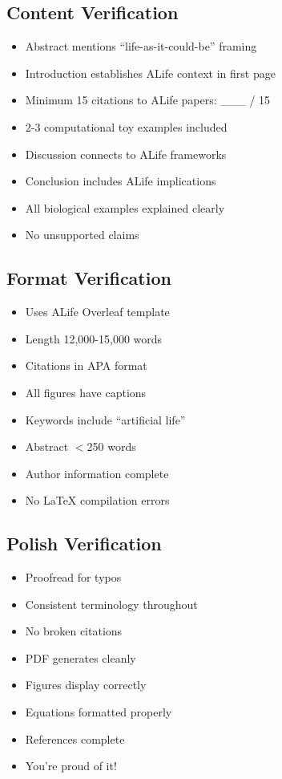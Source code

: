 \documentclass[11pt]{article}
\begin{document}
\subsection*{Content Verification}
\begin{itemize}[label=$\square$]
    \item Abstract mentions ``life-as-it-could-be'' framing
    \item Introduction establishes ALife context in first page
    \item Minimum 15 citations to ALife papers: \_\_\_ / 15
    \item 2-3 computational toy examples included
    \item Discussion connects to ALife frameworks
    \item Conclusion includes ALife implications
    \item All biological examples explained clearly
    \item No unsupported claims
\end{itemize}

\subsection*{Format Verification}
\begin{itemize}[label=$\square$]
    \item Uses ALife Overleaf template
    \item Length 12,000-15,000 words
    \item Citations in APA format
    \item All figures have captions
    \item Keywords include ``artificial life''
    \item Abstract $<$250 words
    \item Author information complete
    \item No LaTeX compilation errors
\end{itemize}

\subsection*{Polish Verification}
\begin{itemize}[label=$\square$]
    \item Proofread for typos
    \item Consistent terminology throughout
    \item No broken citations
    \item PDF generates cleanly
    \item Figures display correctly
    \item Equations formatted properly
    \item References complete
    \item You're proud of it!
\end{itemize}
\end{document}
